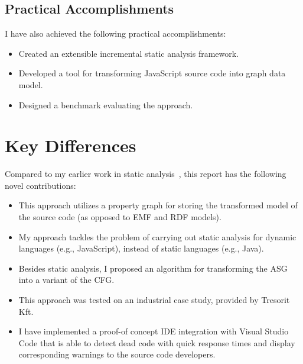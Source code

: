 \subsection{Practical Accomplishments}
I have also achieved the following practical accomplishments:

\begin{itemize}[topsep=0pt]
	\item Created an extensible incremental static analysis framework.
	\item Developed a tool for transforming JavaScript source code into graph data model.
	\item Designed a benchmark evaluating the approach.
\end{itemize}

\section{Key Differences}
Compared to my earlier work in static analysis~\cite{stein-daniel-tdk,stein-daniel-bsc,stein-daniel-ttc}, this report has the following novel contributions:

\begin{itemize}[topsep=0pt]
	\item This approach utilizes a property graph for storing the transformed model of the source code (as opposed to EMF and RDF models).

	\item My approach tackles the problem of carrying out static analysis for dynamic languages (e.g., JavaScript), instead of static languages (e.g., Java).

	\item Besides static analysis, I proposed an algorithm for transforming the ASG into a variant of the CFG.

	\item This approach was tested on an industrial case study, provided by Tresorit Kft.

	\item I have implemented a proof-of concept IDE integration with Visual Studio Code that is able to detect dead code with quick response times and display corresponding warnings to the source code developers.
\end{itemize}
